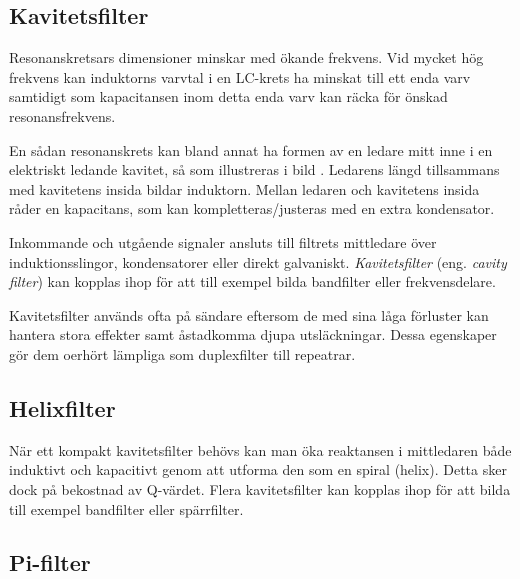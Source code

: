 \newpage %
\subsection{Kavitetsfilter}


Resonanskretsars dimensioner minskar med ökande frekvens.
Vid mycket hög frekvens kan induktorns varvtal i en LC-krets ha minskat till
ett enda varv samtidigt som kapacitansen inom detta enda varv kan räcka för
önskad resonansfrekvens.

En sådan resonanskrets kan bland annat ha formen av en ledare mitt inne i en
elektriskt ledande kavitet, så som illustreras i bild .
Ledarens längd tillsammans med kavitetens insida bildar induktorn.
Mellan ledaren och kavitetens insida råder en kapacitans, som kan
kompletteras/justeras med en extra kondensator.


Inkommande och utgående signaler ansluts till filtrets mittledare över
induktionsslingor, kondensatorer eller direkt galvaniskt.
\emph{Kavitetsfilter} (eng. \emph{cavity filter}) kan kopplas ihop för att till exempel 
bilda bandfilter eller frekvensdelare.

Kavitetsfilter används ofta på sändare eftersom de med sina låga förluster kan
hantera stora effekter samt åstadkomma djupa utsläckningar.
Dessa egenskaper gör dem oerhört lämpliga som duplexfilter till repeatrar.

\subsection{Helixfilter}

När ett kompakt kavitetsfilter behövs kan man öka reaktansen i mittledaren
både induktivt och kapacitivt genom att utforma den som en spiral (helix).
Detta sker dock på bekostnad av Q-värdet.
Flera kavitetsfilter kan kopplas ihop för att bilda till exempel bandfilter eller spärrfilter.

\subsection{Pi-filter}

